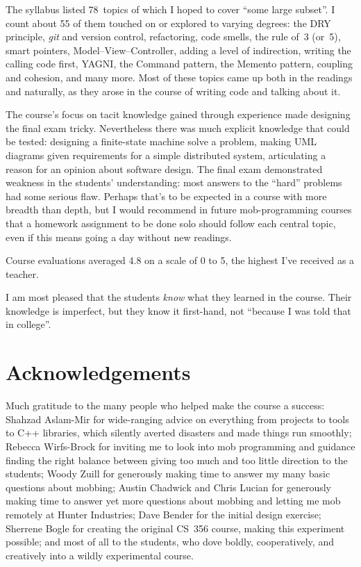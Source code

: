 \documentclass{article}
\begin{document}
The syllabus listed 78~topics of which I hoped to cover ``some large subset''.
I count about 55 of them touched on or explored to varying degrees:
the DRY principle, \emph{git} and version control, refactoring, code smells, 
the rule of~3 (or~5), smart pointers, Model--View--Controller, adding a level
of indirection, writing the calling code first, YAGNI, the Command pattern, the
Memento pattern, coupling and cohesion, and many more. Most of these topics
came up both in the readings and naturally, as they arose in the course of
writing code and talking about it.

The course's focus on tacit knowledge gained through experience made designing
the final exam tricky.  Nevertheless there was much explicit knowledge that
could be tested: designing a finite-state machine solve a problem, making
UML diagrams given requirements for a simple distributed system, articulating a
reason for an opinion about software design. The final exam demonstrated
weakness in the students' understanding: most answers to the ``hard'' problems
had some serious flaw. Perhaps that's to be expected in a course with more
breadth than depth, but I would recommend in future mob-programming courses
that a homework assignment to be done solo should follow each central topic,
even if this means going a day without new readings.

Course evaluations averaged 4.8 on a scale of 0 to 5, the highest I've
received as a teacher.

I am most pleased that the students \emph{know} what they learned in the
course. Their knowledge is imperfect, but they know it first-hand, not
``because I was told that in college''.


\section{Acknowledgements}

Much gratitude to the many people who helped make the course a success:
Shahzad Aslam-Mir for wide-ranging advice on everything from projects to tools
to C++ libraries, which silently averted disasters and made things run
smoothly; Rebecca Wirfs-Brock for inviting me to look into mob programming and
guidance finding the right balance between giving too much and too little
direction to the students; Woody Zuill for generously making time to answer my
many basic questions about mobbing; Austin Chadwick and Chris Lucian for
generously making time to answer yet more questions about mobbing and letting
me mob remotely at Hunter Industries; Dave Bender for the initial design
exercise;
Sherrene Bogle for creating the
original CS~356 course, making this experiment possible; and most of all to
the students, who dove boldly, cooperatively, and creatively into a wildly
experimental course.

\medskip

\printbibliography
\end{document}
